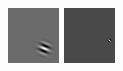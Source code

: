 \begin{figure}[ht]
 \includegraphics[width=\textwidth*11/100]{ch5/figures/firstgabor_Full_3.png}
 \includegraphics[width=\textwidth*11/100]{ch5/figures/firstgabor_Full_4.png}

\end{figure}
